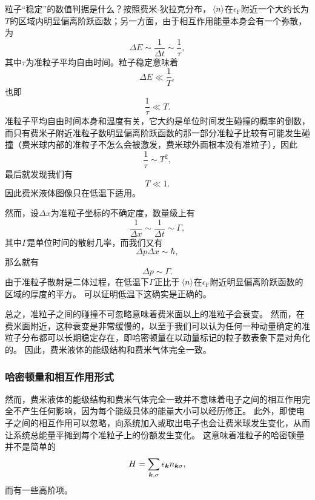 \documentclass[hyperref, UTF8, a4paper]{ctexart}
\begin{document}
粒子“稳定”的数值判据是什么？按照费米-狄拉克分布，$\expval*{{n}}$在$\epsilon_\text{F}$附近一个大约长为$T$的区域内明显偏离阶跃函数；另一方面，由于相互作用能量本身会有一个弥散，为
\[
    \Delta E \sim \frac{1}{\Delta t} \sim \frac{1}{\tau},
\]
其中$\tau$为准粒子平均自由时间。粒子稳定意味着
\[
    \Delta E \ll \frac{1}{T},
\]
也即
\[
    \frac{1}{\tau} \ll T.
\]
准粒子平均自由时间本身和温度有关，它大约是单位时间发生碰撞的概率的倒数，而只有费米子附近准粒子数明显偏离阶跃函数的那一部分准粒子比较有可能发生碰撞（费米球内部的准粒子不怎么会被激发，费米球外面根本没有准粒子），因此
\[
    \frac{1}{\tau} \sim T^2,
\]
最后就发现我们有
\[
    T \ll 1.
\]
因此费米液体图像只在低温下适用。

然而，设$\Delta x$为准粒子坐标的不确定度，数量级上有
\[
    \frac{1}{\Delta x} \sim \frac{1}{\Delta t} \sim \Gamma,
\]
其中$\Gamma$是单位时间的散射几率，而我们又有
\[
    \Delta p \Delta x \sim \hbar,
\]
那么就有
\[
    \Delta p \sim \Gamma.
\]
由于准粒子散射是二体过程，在低温下$\Gamma$正比于$\expval*{{n}}$在$\epsilon_\text{F}$附近明显偏离阶跃函数的区域的厚度的平方。
可以证明低温下这确实是正确的。

总之，准粒子之间的碰撞不可忽略意味着费米面以上的准粒子会衰变。
然而，在费米面附近，这种衰变是非常缓慢的，以至于我们可以认为任何一种动量确定的准粒子分布都可以长期稳定存在，即哈密顿量在以动量标记的粒子数表象下是对角化的。
因此，费米液体的能级结构和费米气体完全一致。

\subsubsection{哈密顿量和相互作用形式}

然而，费米液体的能级结构和费米气体完全一致并不意味着电子之间的相互作用完全不产生任何影响，因为每个能级具体的能量大小可以经历修正。
此外，即使电子之间的相互作用可以忽略，向系统加入或取出电子也会让费米球发生变化，从而让系统总能量平摊到每个准粒子上的份额发生变化。
这意味着准粒子的哈密顿量并不是简单的
\[
    H = \sum_{\vb*{k}, \sigma} \epsilon_{\vb*{k}} n_{\vb*{k} \sigma},
\]
而有一些高阶项。
\end{document}
